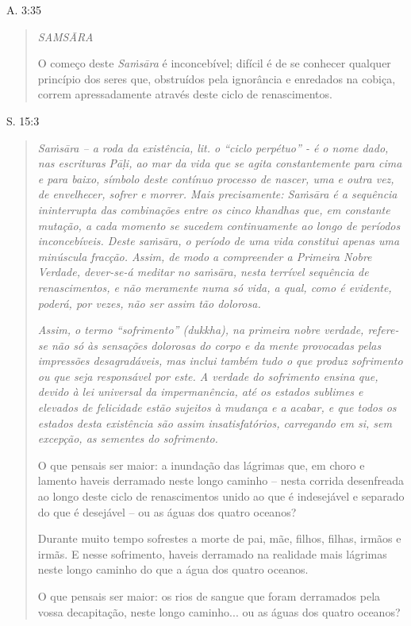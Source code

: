 A. 3:35

\begin{quote}
\emph{SAMSĀRA}

O começo deste \emph{Saṁsāra} é inconcebível; difícil é de se conhecer qualquer princípio dos seres que, obstruídos pela ignorância e enredados na cobiça, correm apressadamente através deste ciclo de renascimentos.
\end{quote}

S. 15:3

\begin{quote}
\emph{Saṁsāra -- a roda da existência, lit. o ``ciclo perpétuo'' - é o nome dado, nas escrituras Pāḷi, ao mar da vida que se agita constantemente para cima e para baixo, símbolo deste contínuo processo de nascer, uma e outra vez, de envelhecer, sofrer e morrer. Mais precisamente: Saṁsāra é a sequência ininterrupta das combinações entre os cinco khandhas que, em constante mutação, a cada momento se sucedem continuamente ao longo de períodos inconcebíveis. Deste saṁsāra, o período de uma vida constitui apenas uma minúscula fracção. Assim, de modo a compreender a Primeira Nobre Verdade, dever-se-á meditar no saṁsāra, nesta terrível sequência de renascimentos, e não meramente numa só vida, a qual, como é evidente, poderá, por vezes, não ser assim tão dolorosa.}

\emph{Assim, o termo ``sofrimento'' (dukkha), na primeira nobre verdade, refere-se não só às sensações dolorosas do corpo e da mente provocadas pelas impressões desagradáveis, mas inclui também tudo o que produz sofrimento ou que seja responsável por este. A verdade do sofrimento ensina que, devido à lei universal da impermanência, até os estados sublimes e elevados de felicidade estão sujeitos à mudança e a acabar, e que todos os estados desta existência são assim insatisfatórios, carregando em si, sem excepção, as sementes do sofrimento.}

O que pensais ser maior: a inundação das lágrimas que, em choro e lamento haveis derramado neste longo caminho -- nesta corrida desenfreada ao longo deste ciclo de renascimentos unido ao que é indesejável e separado do que é desejável -- ou as águas dos quatro oceanos?

Durante muito tempo sofrestes a morte de pai, mãe, filhos, filhas, irmãos e irmãs. E nesse sofrimento, haveis derramado na realidade mais lágrimas neste longo caminho do que a água dos quatro oceanos.

O que pensais ser maior: os rios de sangue que foram derramados pela vossa decapitação, neste longo caminho... ou as águas dos quatro oceanos?


\end{quote}
